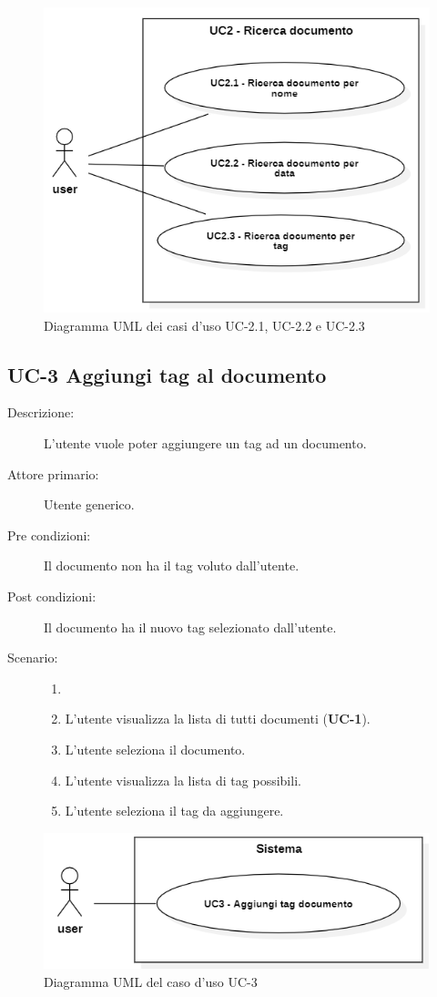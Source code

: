 \begin{figure}[H]
    \centering
    \includegraphics[width=0.8\linewidth]{UC2.1-2-3.png} %
    \caption{Diagramma UML dei casi d'uso UC-2.1, UC-2.2 e UC-2.3}
    \label{fig:UC4.1-2-3}
\end{figure}

\subsection{UC-3 Aggiungi tag al documento}
\begin{description}
    \item[Descrizione:] L’utente vuole poter aggiungere un tag ad un documento.
    \item[Attore primario:] Utente generico.
    \item[Pre condizioni:] Il documento non ha il tag voluto dall’utente.
    \item[Post condizioni:] Il documento ha il nuovo tag selezionato dall’utente.
    \item[Scenario:]
    \begin{enumerate}
        \item[]
        \item L’utente visualizza la lista di tutti documenti (\textbf{UC-1}).
        \item L'utente seleziona il documento.
        \item L’utente visualizza la lista di tag possibili.
        \item L’utente seleziona il tag da aggiungere.
    \end{enumerate}
\end{description}

\begin{figure}[H]
    \centering
    \includegraphics[width=0.8\linewidth]{UC3.png} %
    \caption{Diagramma UML del caso d'uso UC-3}
    \label{fig:UC5}
\end{figure}

